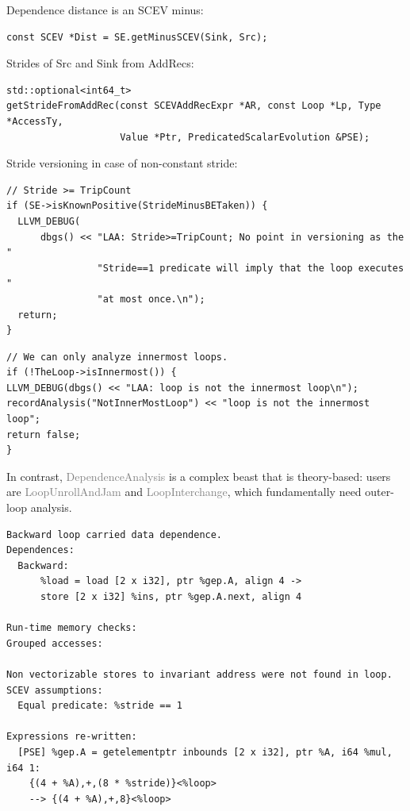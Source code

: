 \documentclass{beamer}
\begin{document}
\begin{frame}[containsverbatim]
  Dependence distance is an SCEV minus:
  \begin{verbatim}
const SCEV *Dist = SE.getMinusSCEV(Sink, Src);
  \end{verbatim}
  \vspace{2em}
  Strides of Src and Sink from AddRecs:
  \begin{verbatim}
std::optional<int64_t>
getStrideFromAddRec(const SCEVAddRecExpr *AR, const Loop *Lp, Type *AccessTy,
                    Value *Ptr, PredicatedScalarEvolution &PSE);
  \end{verbatim}
  \vspace{2em}
  Stride versioning in case of non-constant stride:
  \begin{verbatim}
// Stride >= TripCount
if (SE->isKnownPositive(StrideMinusBETaken)) {
  LLVM_DEBUG(
      dbgs() << "LAA: Stride>=TripCount; No point in versioning as the "
                "Stride==1 predicate will imply that the loop executes "
                "at most once.\n");
  return;
}
  \end{verbatim}
\end{frame}

\begin{frame}[containsverbatim]
  \begin{verbatim}
// We can only analyze innermost loops.
if (!TheLoop->isInnermost()) {
LLVM_DEBUG(dbgs() << "LAA: loop is not the innermost loop\n");
recordAnalysis("NotInnerMostLoop") << "loop is not the innermost loop";
return false;
}
\end{verbatim}

  \vspace{1em}

  In contrast, \textcolor{gray}{DependenceAnalysis} is a complex beast that is theory-based: users are \textcolor{gray}{LoopUnrollAndJam} and \textcolor{gray}{LoopInterchange}, which fundamentally need outer-loop analysis.
\end{frame}

\begin{frame}[containsverbatim]
  \begin{adjustwidth}{-1em}{-1em}
    \begin{verbatim}
Backward loop carried data dependence.
Dependences:
  Backward:
      %load = load [2 x i32], ptr %gep.A, align 4 ->
      store [2 x i32] %ins, ptr %gep.A.next, align 4

Run-time memory checks:
Grouped accesses:

Non vectorizable stores to invariant address were not found in loop.
SCEV assumptions:
  Equal predicate: %stride == 1

Expressions re-written:
  [PSE] %gep.A = getelementptr inbounds [2 x i32], ptr %A, i64 %mul, i64 1:
    {(4 + %A),+,(8 * %stride)}<%loop>
    --> {(4 + %A),+,8}<%loop>
    \end{verbatim}
  \end{adjustwidth}
\end{frame}
\end{document}

